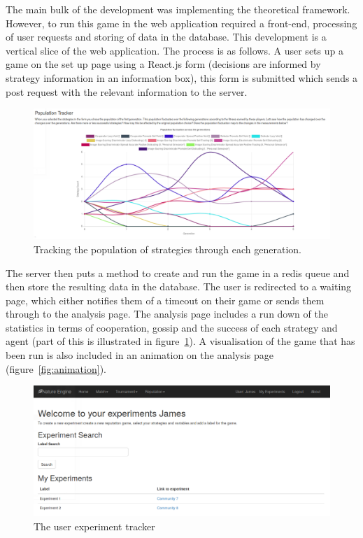 \documentclass[]{final_report}
\begin{document}
The main bulk of the development was implementing the theoretical framework. However, to run this game in the web application required a front-end, processing of user requests and storing of data in the database. This development is a vertical slice of the web application. The process is as follows. A user sets up a game on the set up page using a React.js form (decisions are informed by strategy information in an information box), this form is submitted which sends a post request with the relevant information to the server.\par 
\begin{figure}
\begin{framed}
	\begin{center}
	\includegraphics[width=\textwidth]{PopulationTracker.png}
	\caption{Tracking the population of strategies through each generation.}
	\label{fig:population_tracker}
	\end{center}
\end{framed}
\end{figure}
The server then puts a method to create and run the game in a redis queue and then store the resulting data in the database. The user is redirected to a waiting page, which either notifies them of a timeout on their game or sends them through to the analysis page. The analysis page includes a run down of the statistics in terms of cooperation, gossip and the success of each strategy and agent (part of this is illustrated in figure~\ref{fig:population_tracker}). A visualisation of the game that has been run is also included in an animation on the analysis page (figure~\ref{fig:animation}).\par 
\begin{figure}
\begin{framed}
	\begin{center}
	\includegraphics[width=\textwidth]{UserExperiments.png}
	\caption{The user experiment tracker}
	\label{fig:user_experiments}
	\end{center}
\end{framed}
\end{figure}
\end{document}
